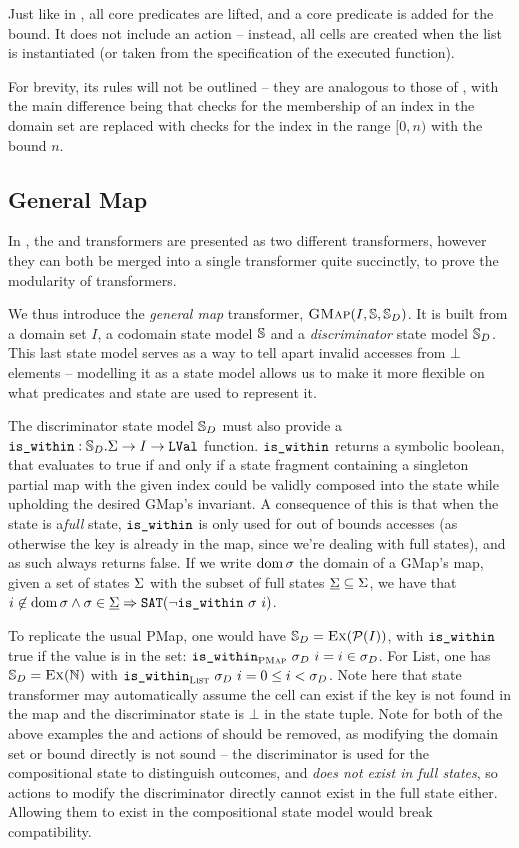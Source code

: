 Just like in \PMap{}, all core predicates are lifted, and a \bound{} core predicate is added for the bound. It does not include an \alloc{} action -- instead, all cells are created when the list is instantiated (or taken from the specification of the executed function).

For brevity, its rules will not be outlined -- they are analogous to those of \PMap{}, with the main difference being that checks for the membership of an index in the domain set are replaced with checks for the index in the range $[0,n)$ with the bound $n$.

\subsection{General Map}

In \cite{sacha-phd}, the \PMap{} and \List{} transformers are presented as two different transformers, however they can both be merged into a single transformer quite succinctly, to prove the modularity of transformers.

We thus introduce the \emph{general map} transformer, $\textsc{GMap}(I,\mathbb S,\mathbb S_D)$. It is built from a domain set $I$, a codomain state model $\mathbb S$ and a \emph{discriminator} state model $\mathbb S_D$. This last state model serves as a way to tell apart invalid accesses from $\bot$ elements -- modelling it as a state model allows us to make it more flexible on what predicates and state are used to represent it.

The discriminator state model $\mathbb S_D$ must also provide a $\texttt{is\_within}:\mathbb S_D.\Sigma\rightarrow I\rightarrow \texttt{LVal}$ function. $\texttt{is\_within}$ returns a symbolic boolean, that evaluates to true if and only if a state fragment containing a singleton partial map with the given index could be validly composed into the state while upholding the desired GMap's invariant. A consequence of this is that when the state is a\emph{full} state, $\texttt{is\_within}$ is only used for out of bounds accesses (as otherwise the key is already in the map, since we're dealing with full states), and as such always returns false. If we write $\operatorname{dom} \sigma$ the domain of a GMap's map, given a set of states $\Sigma$ with the subset of full states $\underline{\Sigma}\subseteq\Sigma$, we have that $i\not\in \operatorname{dom}\sigma \land \sigma \in \underline{\Sigma} \Rightarrow \operatorname{\texttt{SAT}}(\neg\texttt{is\_within}~\sigma~i)$.

To replicate the usual PMap, one would have $\mathbb S_D=\textsc{Ex}({\cal P}(I))$, with $\texttt{is\_within}$ true if the value is in the set: $\texttt{is\_within}_{\textsc{PMap}}~\sigma_D~i=i\in\sigma_D$. For List, one has $\mathbb S_D=\textsc{Ex}(\mathbb N)$ with $\texttt{is\_within}_{\textsc{List}}~\sigma_D~i=0 \leq i < \sigma_D$. Note here that state transformer may automatically assume the cell can exist if the key is not found in the map and the discriminator state is $\bot$ in the state tuple. Note for both of the above examples the \load{} and \store{} actions of \Ex{} should be removed, as modifying the domain set or bound directly is not sound -- the discriminator is used for the compositional state to distinguish outcomes, and \emph{does not exist in full states}, so actions to modify the discriminator directly cannot exist in the full state either. Allowing them to exist in the compositional state model would break compatibility.


